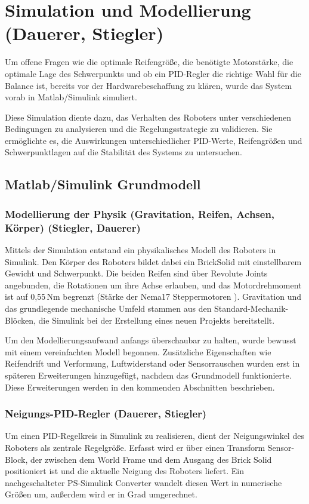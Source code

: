 \documentclass[fontsize=12pt,
parskip=half,	%
department=FakM,  %
logostyle=flat,
twoside, %
DIV=15,BCOR=10mm, %
]{OTHRreprt}
\begin{document}
\chapter{Simulation und Modellierung (Dauerer, Stiegler)}
\label{ch:simulation}

Um offene Fragen wie die optimale Reifengröße, die benötigte Motorstärke, die optimale Lage des Schwerpunkts und ob ein PID-Regler die richtige Wahl für die Balance ist, bereits vor der Hardwarebeschaffung zu klären, wurde das System vorab in Matlab/Simulink simuliert.

Diese Simulation diente dazu, das Verhalten des Roboters unter verschiedenen Bedingungen zu analysieren und die Regelungsstrategie zu validieren. Sie ermöglichte es, die Auswirkungen unterschiedlicher PID-Werte, Reifengrößen und Schwerpunktlagen auf die Stabilität des Systems zu untersuchen.

\section{Matlab/Simulink Grundmodell}
\label{sec:simulink_grundmodell}

\subsection{Modellierung der Physik (Gravitation, Reifen, Achsen, Körper) (Stiegler, Dauerer)}
\label{subsec:simulink_physik}

Mittels der Simulation entstand ein physikalisches Modell des Roboters in Simulink. Den Körper des Roboters bildet dabei ein BrickSolid mit einstellbarem Gewicht und Schwerpunkt. Die beiden Reifen sind über Revolute Joints angebunden, die Rotationen um ihre Achse erlauben, und das Motordrehmoment ist auf 0,55\,Nm begrenzt (Stärke der Nema17 Steppermotoren \cite{Nema17HS151504S1_Full_Datasheet}). Gravitation und das grundlegende mechanische Umfeld stammen aus den Standard-Mechanik-Blöcken, die Simulink bei der Erstellung eines neuen Projekts bereitstellt.


Um den Modellierungsaufwand anfangs überschaubar zu halten, wurde bewusst mit einem vereinfachten Modell begonnen. Zusätzliche Eigenschaften wie Reifendrift und Verformung, Luftwiderstand oder Sensorrauschen wurden erst in späteren Erweiterungen hinzugefügt, nachdem das Grundmodell funktionierte. Diese Erweiterungen werden in den kommenden Abschnitten beschrieben.

\subsection{Neigungs-PID-Regler (Dauerer, Stiegler)}
\label{subsec:simulink_neigungs_pid}
Um einen PID-Regelkreis in Simulink zu realisieren, dient der Neigungswinkel des Roboters als zentrale Regelgröße. Erfasst wird er über einen Transform Sensor-Block, der zwischen dem World Frame und dem Ausgang des Brick Solid positioniert ist und die aktuelle Neigung des Roboters liefert. Ein nachgeschalteter PS-Simulink Converter wandelt diesen Wert in numerische Größen um, außerdem wird er in Grad umgerechnet.
\end{document}

